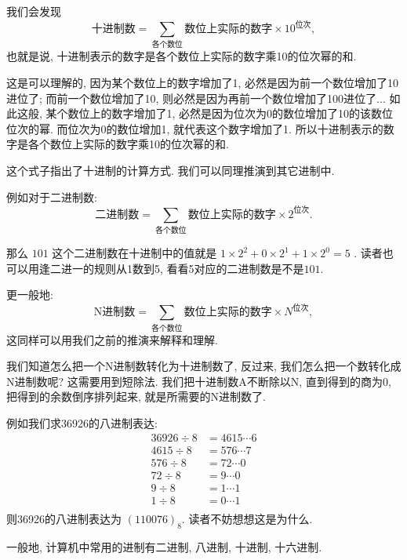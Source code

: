         我们会发现
            \[ \mbox{十进制数} = \sum _ {\mbox{各个数位}} \mbox{数位上实际的数字} \times 10 ^ {\mbox{位次}}, \]
        也就是说, 十进制表示的数字是各个数位上实际的数字乘10的位次幂的和. 
        
        这是可以理解的, 因为某个数位上的数字增加了1, 必然是因为前一个数位增加了10进位了; 而前一个数位增加了10, 则必然是因为再前一个数位增加了100进位了... 如此这般, 某个数位上的数字增加了1, 必然是因为位次为0的数位增加了10的该数位位次的幂. 而位次为0的数位增加1, 就代表这个数字增加了1. 所以十进制表示的数字是各个数位上实际的数字乘10的位次幂的和.

        这个式子指出了十进制的计算方式. 我们可以同理推演到其它进制中.

        例如对于二进制数:
            \[ \mbox{二进制数} = \sum _ {\mbox{各个数位}} \mbox{数位上实际的数字} \times 2 ^ {\mbox{位次}}. \]

        那么 $ 101 $ 这个二进制数在十进制中的值就是 $ 1 \times 2 ^ 2 + 0 \times 2 ^ 1 + 1 \times 2 ^ 0 = 5 $ . 读者也可以用逢二进一的规则从1数到5, 看看5对应的二进制数是不是$101$.

        更一般地:
            \begin{equation*}
                \mbox{N进制数} = \sum _ {\mbox{各个数位}} \mbox{数位上实际的数字} \times N ^ {\mbox{位次}}, \label{进制转换公式}
            \end{equation*}
        这同样可以用我们之前的推演来解释和理解.

        我们知道怎么把一个N进制数转化为十进制数了, 反过来, 我们怎么把一个数转化成N进制数呢? 这需要用到短除法. 我们把十进制数A不断除以N, 直到得到的商为0, 把得到的余数倒序排列起来, 就是所需要的N进制数了.

        例如我们求36926的八进制表达:
        \begin{align*}
            36926 \div 8 &= 4615 \cdots 6 \\
            4615 \div 8 &= 576 \cdots 7 \\
            576 \div 8 &= 72 \cdots 0 \\
            72 \div 8 &= 9 \cdots 0 \\
            9 \div 8 &= 1 \cdots 1 \\
            1 \div 8 &= 0 \cdots 1 \\
        \end{align*}
        则36926的八进制表达为 $ (110076)_8 $. 读者不妨想想这是为什么.

        一般地, 计算机中常用的进制有二进制, 八进制, 十进制, 十六进制.

